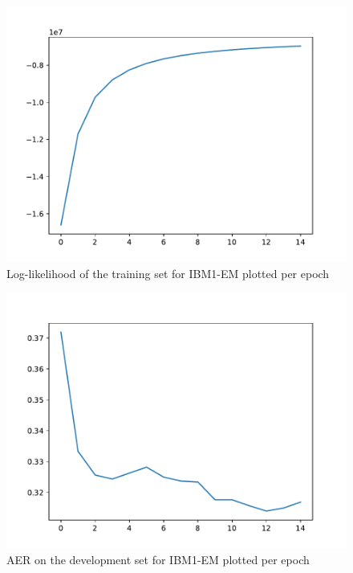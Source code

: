 \documentclass[11pt,a4paper]{article}
\begin{document}
\begin{figure}
\includegraphics[width=\linewidth]{images/log-likelihood.pdf}
\caption{Log-likelihood of the training set for IBM1-EM plotted per epoch}
\label{fig:ll-1}
\end{figure}

\begin{figure}
\includegraphics[width=\linewidth]{images/AER-plot.pdf}
\caption{AER on the development set for IBM1-EM plotted per epoch}
\label{fig:AER-1}
\end{figure}
\end{document}
